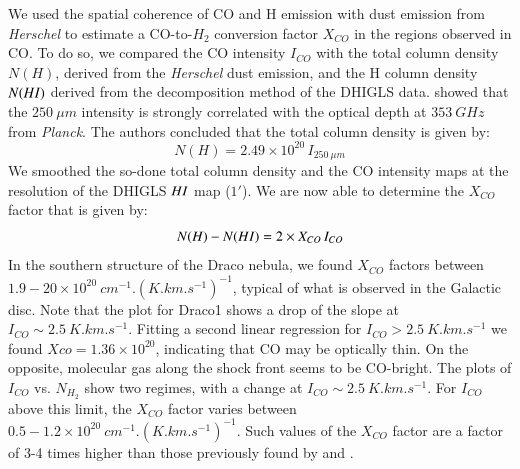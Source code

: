 \documentclass[traditabstract]{aa}
\begin{document}
   We used the spatial coherence of CO and H emission with dust emission from \emph{Herschel} to estimate a CO-to-$H_2$ conversion factor $X_{CO}$ in the regions observed in CO. To do so, we compared the CO intensity $I_{CO}$ with the total column density $N(H)$, derived from the \emph{Herschel} dust emission, and the H column density $N(H\rmnum{1})$ derived from the decomposition method of the DHIGLS data. \cite{MAMD_2017b} showed that the $250\: \mu m$ intensity is strongly correlated with the optical depth at $353\: GHz$ from \emph{Planck}. The authors concluded that the total column density is given by:
\begin{equation}
  N(H)=2.49\times 10^{20}\, I_{250\: \mu m}
\end{equation}
We smoothed the so-done total column density and the CO intensity maps at the resolution of the DHIGLS $H\rmnum{1}$ map ($1'$). We are now able to determine the $X_{CO}$ factor that is given by:
\begin{equation}
  N(H)-N(H\rmnum{1})=2\times X_{CO}\, I_{CO}
\end{equation}
In the southern structure of the Draco nebula, we found $X_{CO}$ factors between $1.9-20\times 10^{20}\: cm^{-1}.(K.km.s^{-1})^{-1}$, typical of what is observed in the Galactic disc\citep{Bolatto_2013}. Note that the plot for Draco1 shows a drop of the slope at $I_{CO}\sim 2.5\: K.km.s^{-1}$. Fitting a second linear regression for $I_{CO}>2.5\: K.km.s^{-1}$ we found $Xco=1.36\times 10^{20}$, indicating that CO may be optically thin.
On the opposite, molecular gas along the shock front seems to be CO-bright. The plots of $I_{CO}$ vs. $N_{H_2}$ show two regimes, with a change at $I_{CO}\sim 2.5\: K.km.s^{-1}$. For $I_{CO}$ above this limit, the $X_{CO}$ factor varies between $0.5-1.2\times 10^{20}\: cm^{-1}.(K.km.s^{-1})^{-1}$.
Such values of the $X_{CO}$ factor are a factor of 3-4 times higher than those previously found by \cite{Herbstmeier_1993} and \cite{Moritz_1998}.
\end{document}
